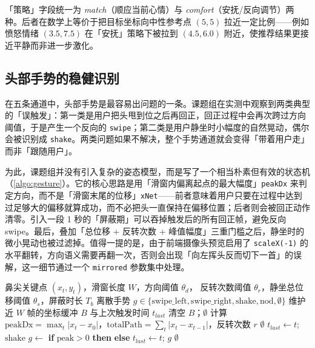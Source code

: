 「策略」字段统一为 \emph{match}（顺应当前心情）与 \emph{comfort}（安抚/反向调节）两种。后者在数学上等价于把目标坐标向中性参考点 $(5, 5)$ 拉近一定比例——例如愤怒情绪 $(3.5, 7.5)$ 在「安抚」策略下被拉到 $(4.5, 6.0)$ 附近，使推荐结果更接近平静而非进一步激化。

\subsection{头部手势的稳健识别}

在五条通道中，头部手势是最容易出问题的一条。课题组在实测中观察到两类典型的「误触发」：第一类是用户把头甩到位之后再回正，回正过程中会再次跨过方向阈值，于是产生一个反向的 \texttt{swipe}；第二类是用户静坐时小幅度的自然晃动，偶尔会被识别成 \texttt{shake}。两类问题如果不解决，整个手势通道就会变得「带着用户走」而非「跟随用户」。

为此，课题组并没有引入复杂的姿态模型，而是写了一个相当朴素但有效的状态机（\cref{algo:gesture}）。它的核心思路是用「滑窗内偏离起点的最大幅度」\texttt{peakDx} 来判定方向，而不是「滑窗末尾的位移」\texttt{xNet}——前者意味着用户只要在过程中达到过足够大的偏移就算成功，而不必把头一直保持在偏移位置；后者则会被回正动作清零。引入一段 1 秒的「屏蔽期」可以吞掉触发后的所有回正帧，避免反向 swipe。最后，叠加「总位移 + 反转次数 + 峰值幅度」三重门槛之后，静坐时的微小晃动也被过滤掉。值得一提的是，由于前端摄像头预览启用了 \texttt{scaleX(-1)} 的水平翻转，方向语义需要再翻一次，否则会出现「向左挥头反而切下一首」的误解，这一细节通过一个 \texttt{mirrored} 参数集中处理。

\begin{algorithm}[!htb]
  \caption{头部手势识别状态机（简化版）}\label{algo:gesture}
  \begin{algorithmic}[1]
    \Require 鼻尖关键点 $(x_t, y_t)$，滑窗长度 $W$，方向阈值 $\theta_d$，
      反转次数阈值 $\theta_r$，静坐总位移阈值 $\theta_s$，屏蔽时长 $T_b$
    \Ensure 离散手势 $g \in \{\text{swipe\_left}, \text{swipe\_right}, \text{shake}, \text{nod}, \emptyset\}$
    \State 维护近 $W$ 帧的坐标缓冲 $B$ 与上次触发时间 $t_{last}$
     \State 清空 $B$；\Return $\emptyset$ \EndIf
    \State 计算 $\text{peakDx} = \max_t |x_t - x_0|$，$\text{totalPath} = \sum_t |x_t - x_{t-1}|$，反转次数 $r$
     \State \Return $\emptyset$  \EndIf
     \State $t_{last} \gets t$; \Return $\text{shake}$ \EndIf
      \State $g \gets$ \textbf{if} $\text{peak}>0$ \textbf{then}  \textbf{else} 
      \State $t_{last} \gets t$; \Return $g$
    \EndIf
    \State \Return $\emptyset$
  \end{algorithmic}
\end{algorithm}

